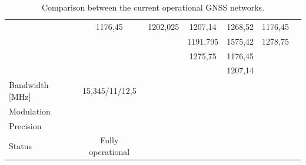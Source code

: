 \begin{table}[!h]
\begin{tabular}{lcccccc}
                                         & 1176,45           & 1202,025                     & 1207,14              & 1268,52        & 1176,45 &  \\
                                         &                   &                              & 1191,795             & 1575,42        & 1278,75 &  \\
                                         &                   &                              & 1275,75              & 1176,45        &         &  \\
                                         &                   &                              &                      & 1207,14        &         &  \\
        Bandwidth [MHz]                  & 15,345/11/12,5    &                              &                      &                &         &  \\
        Modulation                       &                   &                              &                      &                &         &  \\
        Precision                        &                   &                              &                      &                &         &  \\
        Status                           & Fully operational &                              &                      &                &         &  \\
        \bottomrule[1.5pt]
    \end{tabular}
    \caption{Comparison between the current operational GNSS networks.}
    \label{tab:networks-comparison}
\end{table}


